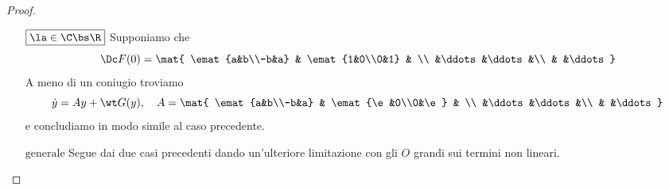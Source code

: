 \begin{proof}
\begin{itemize}
        \[0\leq \norm{\mat{y_1-y_2\\\vdots\\y_{d-1}-y_d}}^2.\]
        Cerchiamo dunque condizioni valide per $\e$ e $\norm y$:\\
        Poich\'e $\la<0$ \`e lecito fissare $\e\in(0,\abs\la)$. Per le propriet\`a degli $O$ grandi esistono $r,C>0$ tali che
        \[\norm y<r\implies \dot V(y)\leq((\la+\e)+C\norm y)\norm y^2.\]
        Ponendo ora $\la+\e+C\norm y<0$ si ha che se 
        \[r'<\min\cpa{r,\frac{\abs{\la+\e}}{C}}\]
        allora per $y\in B_{r'}(0)\bs\cpa0$ vale
        \[\dot V(y)\leq ((\la+\e)+C\norm y)\norm y^2<0,\]
        cio\`e $V$ \`e una funzione di Lyapunov stretta per $x_0$ in un opportuno cambio di base, dunque $x_0$ \`e asintoticamente stabile per il secondo teorema di Lyapunov (\ref{TeoremaLyapunov2AsintoticaStabilita}).
        \item[$\boxed{\la\in\C\bs \R}$] Supponiamo che
        \[\Dc F(0)=\mat{
        \emat{a&b\\-b&a} & \emat{1&0\\0&1}     &      \\
            &\ddots &\ddots&\\
            &       &\ddots
        }\]
        A meno di un coniugio troviamo
        \[\dot y=Ay+\wt G(y),\quad A=\mat{
        \emat{a&b\\-b&a} & \emat{\e&0\\0&\e}     &      \\
            &\ddots &\ddots&\\
            &       &\ddots
        }\]
        e concludiamo in modo simile al caso precedente.
        \item[$\boxed{\text{generale}}$] Segue dai due casi precedenti dando un'ulteriore limitazione con gli $O$ grandi sui termini non lineari.
    \end{itemize}
    \setlength{\leftmargini}{0.5cm}
\end{proof}

